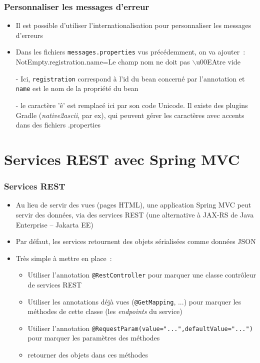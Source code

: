 \documentclass{beamer}
\begin{document}
\begin{frame}
	\frametitle{Personnaliser les messages d'erreur}
	\begin{itemize}
		\item Il est possible d'utiliser l'internationalisation pour personnaliser les messages d'erreurs
		\item Dans les fichiers \texttt{messages.properties} vus précédemment, on va ajouter~:\\
		NotEmpty.registration.name=Le champ nom ne doit pas $\backslash$u00EAtre vide
		\item[-]Ici, \texttt{registration} correspond à l'id du bean concerné par l'annotation et \texttt{name} est le nom de la propriété du bean
		\item[-]le caractère 'ê' est remplacé ici par son code Unicode. Il existe des plugins Gradle (\textit{native2ascii}, par ex), qui peuvent gérer les caractères avec accents dans des fichiers .properties
	\end{itemize}
\end{frame} 

\section{Services REST avec Spring MVC}
\begin{frame}
	\frametitle{Services REST}
	\begin{itemize}
		\item Au lieu de servir des vues (pages HTML), une application Spring MVC peut servir des données, via des services REST (une alternative à JAX-RS de Java Enterprise -- Jakarta EE)
		\item Par défaut, les services retournent des objets sérialisées comme données JSON
		\item Très simple à mettre en place~:
		\begin{itemize}
			\item Utiliser l'annotation \texttt{@RestController} pour marquer une classe contrôleur de services REST
			\item Utiliser les annotations déjà vues (\texttt{@GetMapping}, ...) pour marquer les méthodes de cette classe (les \textit{endpoints} du service)
			\item Utiliser l'annotation \texttt{@RequestParam(value="...",defaultValue="...")} pour marquer les paramètres des méthodes
			\item retourner des objets dans ces méthodes
		\end{itemize}
	\end{itemize}
\end{frame} 
\end{document}
